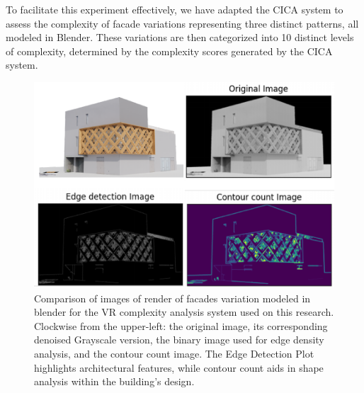 To facilitate this experiment effectively, we have adapted the CICA system to assess the complexity of facade variations representing three distinct patterns, all modeled in Blender.
These variations are then categorized into 10 distinct levels of complexity, determined by the complexity scores generated by the CICA system.

     \begin{figure}[htb]
          \centering
          \includegraphics[width= \linewidth]{Images/ComplexitPlotRenderCICA}
          \caption{Comparison of images of render of facades variation modeled in blender for the VR complexity analysis system used on this research. Clockwise from the upper-left: the original image, its corresponding denoised Grayscale version, the binary image used for edge density analysis, and the contour count image. The Edge Detection Plot highlights architectural features, while contour count aids in shape analysis within the building's design.
          }
          \label{fig:ComplexityPlotRenderCICA}
        \end{figure}

